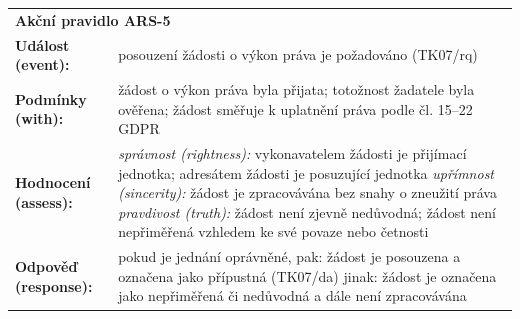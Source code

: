 \begin{itemize}
    \begin{center}
      \renewcommand{\arraystretch}{1.3}
      \begin{tabular}{p{4cm} p{8cm}}
      \multicolumn{2}{l}{\textbf{Akční pravidlo ARS-5}} \\
      \textbf{Událost (event):} & posouzení žádosti o výkon práva je požadováno (TK07/rq) \\
      \textbf{Podmínky (with):} & 
        žádost o výkon práva byla přijata; \newline
        totožnost žadatele byla ověřena; \newline
        žádost směřuje k uplatnění práva podle čl. 15–22 GDPR \\
      \textbf{Hodnocení (assess):} & 
        \textit{správnost (rightness):} \newline
        \quad vykonavatelem žádosti je přijímací jednotka; \newline
        \quad adresátem žádosti je posuzující jednotka \newline
        \textit{upřímnost (sincerity):} \newline
        \quad žádost je zpracovávána bez snahy o zneužití práva \newline
        \textit{pravdivost (truth):} \newline
        \quad žádost není zjevně nedůvodná; \newline
        \quad žádost není nepřiměřená vzhledem ke své povaze nebo četnosti \\
      \textbf{Odpověď (response):} & 
        pokud je jednání oprávněné, pak: \newline
        \quad žádost je posouzena a označena jako přípustná (TK07/da) \newline
        jinak: \newline
        \quad žádost je označena jako nepřiměřená či nedůvodná \newline
        \quad a dále není zpracovávána \\
      \end{tabular}
    \end{center}


\end{itemize}
